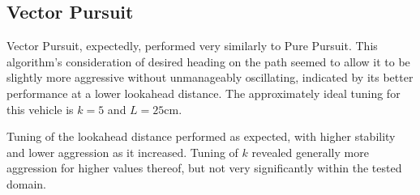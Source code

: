 \documentclass[12pt]{article}
\begin{document}
\begin{flushleft}
\begin{figure}[H]
\endminipage
\end{figure}

\subsection{Vector Pursuit}

Vector Pursuit, expectedly, performed very similarly to Pure Pursuit. This algorithm's consideration of desired heading on the path seemed to allow it to be slightly more aggressive without unmanageably oscillating, indicated by its better performance at a lower lookahead distance. The approximately ideal tuning for this vehicle is $k=5$ and $L=25$cm. 

Tuning of the lookahead distance performed as expected, with higher stability and lower aggression as it increased. Tuning of $k$ revealed generally more aggression for higher values thereof, but not very significantly within the tested domain. 


\end{flushleft}
\end{document}
